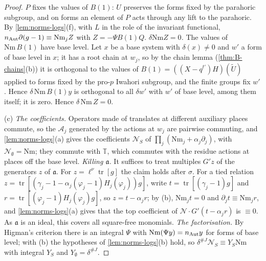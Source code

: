 \begin{proof}
$P$ fixes the values of $B(1)$: $U$ preserves the forms fixed by the parahoric subgroup, and on forms an element of $P$ acts through any lift to the parahoric. By \cref{lem:norms-logs}(f), with $L$ in the role of the invariant functional,
$n_{\rm Aut}\partial(g-1)\equiv\mathrm{Nm}_jZ$ with $Z=-\Psi B(1)Q$. \emph{$\delta\mathrm{Nm}Z=0$.} The values of $\mathrm{Nm}\,B(1)$ have base level. Let $x$ be a base system with $\delta(x)\ne0$ and $w'$ a form of base level in $x$; it has a root chain at $w_j$, so by the
chain lemma (\cref{thm:B-chains}(b)) it is orthogonal to the values of $B(1)=((X-q^{t'})H)(\tilde U)$ applied to forms fixed by the pro-$p$ Iwahori subgroup, and the finite groups fix $w'$. Hence $\delta\,\mathrm{Nm}\,B(1)y$ is orthogonal to all
$\delta w'$ with $w'$ of base level, among them itself; it is zero. Hence $\delta\,\mathrm{Nm}\,Z=0$.

(c) \emph{The coefficients.} Operators made of translates at different auxiliary places commute, so the $\mathcal A_j$ generated by the actions at $w_j$ are pairwise commuting, and \cref{lem:norms-logs}(a) gives the coefficients $\mathcal N_S$ of
$\prod_j(\mathrm{Nm}_j+\alpha_j\partial_j)$, with $\mathcal N_\emptyset=\mathrm{Nm}$; they commute with $\mathbb T$, which commutes with the residue actions at places off the base level. \emph{Killing $\mathfrak a$.} It suffices to treat multiples $G'z$ of the generators $z$ of $\mathfrak a$.
For $z=\ell^\nu\operatorname{tr}[g]$ the claim holds after $\sigma$. For a tied relation $z=\operatorname{tr}[(\gamma_j-1-\alpha_j(\varphi_j-1)H_j(\varphi_j))g]$, write $t=\operatorname{tr}[(\gamma_j-1)g]$ and $r=\operatorname{tr}[(\varphi_j-1)H_j(\varphi_j)g]$, so $z=t-\alpha_jr$; by (b), $\mathrm{Nm}_jt=0$ and
$\partial_jt\equiv\mathrm{Nm}_jr$, and \cref{lem:norms-logs}(a) gives that the top coefficient of $\mathcal N\cdot G'(t-\alpha_jr)$ is $\equiv0$. As $\mathfrak a$ is an ideal, this covers all square-free monomials. \emph{The factorisation.} By Higman's criterion
there is an integral $\Psi$ with $\mathrm{Nm}(\Psi y)=n_{\rm Aut}y$ for forms of base level; with (b) the hypotheses of \cref{lem:norms-logs}(b) hold, so $\delta^{\#J}\mathcal N_S\equiv Y_S\mathrm{Nm}$ with integral $Y_S$ and $Y_\emptyset=\delta^{\#J}$.


\end{proof}
